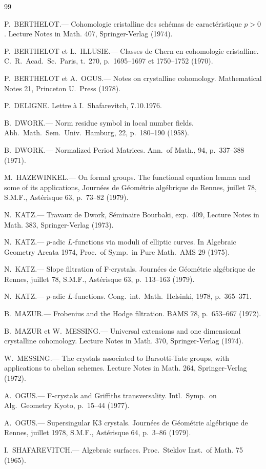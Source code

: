 \documentclass[12pt,a4paper]{article}
\theoremstyle{plain}
\theoremstyle{definition}
\theoremstyle{remark}
\begin{document}
\begin{thebibliography}{99}

P.~BERTHELOT.--- Cohomologie cristalline des sch\'emas de caract\'eristique $p > 0$. Lecture Notes in Math. 407, Springer-Verlag (1974).

P.~BERTHELOT et L.~ILLUSIE.--- Classes de Chern en cohomologie cristalline. C.\ R.\ Acad.\ Sc.\ Paris, t.\ 270, p.\ 1695--1697 et 1750--1752 (1970).

P.~BERTHELOT et A.~OGUS.--- Notes on crystalline cohomology. Mathematical Notes 21, Princeton U.\ Press (1978).

P.~DELIGNE. Lettre \`a I.\ Shafarevitch, 7.10.1976.

B.~DWORK.--- Norm residue symbol in local number fields. Abh.\ Math.\ Sem.\ Univ.\ Hamburg, 22, p.\ 180--190 (1958).

B.~DWORK.--- Normalized Period Matrices. Ann.\ of Math., 94, p.\ 337--388 (1971).

M.\ HAZEWINKEL.--- On formal groups. The functional equation lemma and some of its applications, Journ\'ees de G\'eom\'etrie alg\'ebrique de Rennes, juillet 78, S.M.F., Ast\'erisque 63, p.\ 73--82 (1979).

N.\ KATZ.--- Travaux de Dwork, S\'eminaire Bourbaki, exp.\ 409, Lecture Notes in Math. 383, Springer-Verlag (1973).

N.\ KATZ.--- $p$-adic $L$-functions via moduli of elliptic curves. In Algebraic Geometry Arcata 1974, Proc.\ of Symp.\ in Pure Math.\ AMS 29 (1975).

N.\ KATZ.--- Slope filtration of F-crystals. Journ\'ees de G\'eom\'etrie alg\'ebrique de Rennes, juillet 78, S.M.F., Ast\'erisque 63, p.\ 113--163 (1979).

N.\ KATZ.--- $p$-adic $L$-functions. Cong.\ int.\ Math.\ Helsinki, 1978, p.\ 365--371.

B.\ MAZUR.--- Frobenius and the Hodge filtration. BAMS 78, p.\ 653--667 (1972).

B.\ MAZUR et W.\ MESSING.--- Universal extensions and one dimensional crystalline cohomology. Lecture Notes in Math. 370, Springer-Verlag (1974).

W.\ MESSING.--- The crystals associated to Barsotti-Tate groups, with applications to abelian schemes. Lecture Notes in Math. 264, Springer-Verlag (1972).

A.\ OGUS.--- F-crystals and Griffiths transversality. Intl.\ Symp.\ on Alg.\ Geometry Kyoto, p.\ 15--44 (1977).

A.\ OGUS.--- Supersingular K3 crystals. Journ\'ees de G\'eom\'etrie alg\'ebrique de Rennes, juillet 1978, S.M.F., Ast\'erisque 64, p.\ 3--86 (1979).

I.\ SHAFAREVITCH.--- Algebraic surfaces. Proc.\ Steklov Inst.\ of Math. 75 (1965).

\end{thebibliography}
\end{document}
